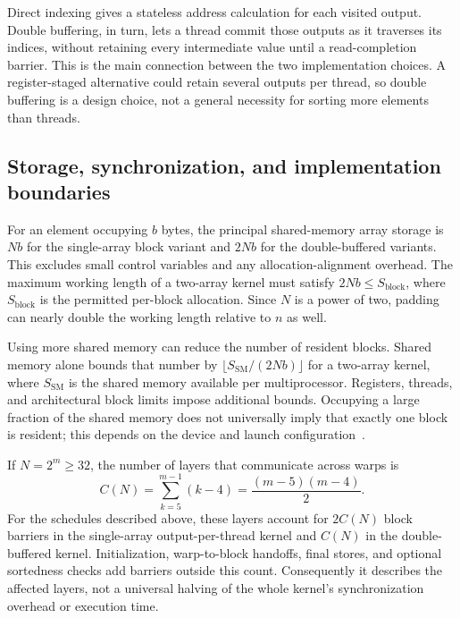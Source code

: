 \documentclass[fleqn,10pt,lineno]{wlpeerj}
\begin{document}
Direct indexing gives a stateless address calculation for each visited output. Double buffering, in turn, lets a thread commit those outputs as it traverses its indices, without retaining every intermediate value until a read-completion barrier. This is the main connection between the two implementation choices. A register-staged alternative could retain several outputs per thread, so double buffering is a design choice, not a general necessity for sorting more elements than threads.

\subsection*{Storage, synchronization, and implementation boundaries}
For an element occupying $b$ bytes, the principal shared-memory array storage is $Nb$ for the single-array block variant and $2Nb$ for the double-buffered variants. This excludes small control variables and any allocation-alignment overhead. The maximum working length of a two-array kernel must satisfy $2Nb\leq S_{\mathrm{block}}$, where $S_{\mathrm{block}}$ is the permitted per-block allocation. Since $N$ is a power of two, padding can nearly double the working length relative to $n$ as well.

Using more shared memory can reduce the number of resident blocks. Shared memory alone bounds that number by $\lfloor S_{\mathrm{SM}}/(2Nb)\rfloor$ for a two-array kernel, where $S_{\mathrm{SM}}$ is the shared memory available per multiprocessor. Registers, threads, and architectural block limits impose additional bounds. Occupying a large fraction of the shared memory does not universally imply that exactly one block is resident; this depends on the device and launch configuration~\citep{nvidiaCudaGuide}.

If $N=2^m\geq32$, the number of layers that communicate across warps is
\begin{equation}
 C(N)=\sum_{k=5}^{m-1}(k-4)=\frac{(m-5)(m-4)}{2}.
\end{equation}
For the schedules described above, these layers account for $2C(N)$ block barriers in the single-array output-per-thread kernel and $C(N)$ in the double-buffered kernel. Initialization, warp-to-block handoffs, final stores, and optional sortedness checks add barriers outside this count. Consequently it describes the affected layers, not a universal halving of the whole kernel's synchronization overhead or execution time.
\end{document}
